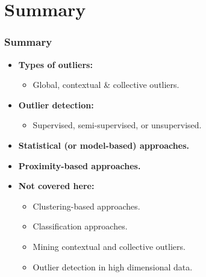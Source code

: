 \section{Summary}

\begin{frame}
  \frametitle{Summary}
  \begin{itemize}
  \item  \textbf{Types of outliers:}
    \begin{itemize}
    \item Global, contextual \& collective outliers.
    \end{itemize}
  \item \textbf{Outlier detection:}
    \begin{itemize}
    \item Supervised, semi-supervised, or unsupervised.
    \end{itemize}
  \item \textbf{Statistical (or model-based) approaches.}
  \item \textbf{Proximity-based approaches.}
  \item \textbf{Not covered here:}
    \begin{itemize}
    \item Clustering-based approaches.
    \item Classification approaches.
    \item Mining contextual and collective outliers.
    \item Outlier detection in high dimensional data.
    \end{itemize}
  \end{itemize}
\end{frame}
